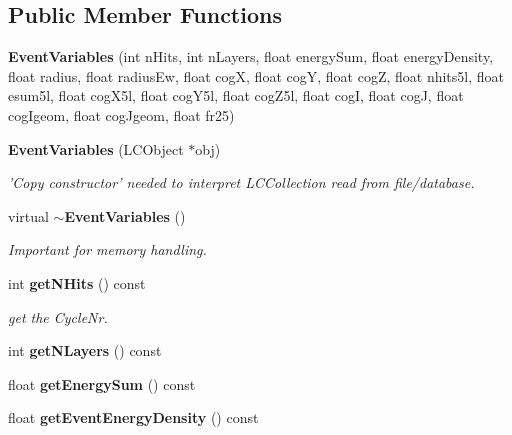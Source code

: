 \subsection*{Public Member Functions}
\begin{DoxyCompactItemize}
\item 
{\bfseries Event\-Variables} (int n\-Hits, int n\-Layers, float energy\-Sum, float energy\-Density, float radius, float radius\-Ew, float cog\-X, float cog\-Y, float cog\-Z, float nhits5l, float esum5l, float cog\-X5l, float cog\-Y5l, float cog\-Z5l, float cog\-I, float cog\-J, float cog\-Igeom, float cog\-Jgeom, float fr25)\label{classCALICE_1_1EventVariables_a65183b6cf71a7d599d7ce195b07ad903}

\item 
{\bf Event\-Variables} (L\-C\-Object $\ast$obj)\label{classCALICE_1_1EventVariables_a97d6ba35bb042c9a6b176421d027737f}

\begin{DoxyCompactList}\small\item\em 'Copy constructor' needed to interpret L\-C\-Collection read from file/database. \end{DoxyCompactList}\item 
virtual {\bf $\sim$\-Event\-Variables} ()\label{classCALICE_1_1EventVariables_a2e106ab35d88b4f406c42217f118f0a0}

\begin{DoxyCompactList}\small\item\em Important for memory handling. \end{DoxyCompactList}\item 
int {\bf get\-N\-Hits} () const \label{classCALICE_1_1EventVariables_add1c66ed54b08a57109260d3881586eb}

\begin{DoxyCompactList}\small\item\em get the Cycle\-Nr. \end{DoxyCompactList}\item 
int {\bfseries get\-N\-Layers} () const \label{classCALICE_1_1EventVariables_ac44e0ec8d550a469994c433c279721ad}

\item 
float {\bfseries get\-Energy\-Sum} () const \label{classCALICE_1_1EventVariables_a2fe40be05a43f725c69dfe1667738bae}

\item 
float {\bfseries get\-Event\-Energy\-Density} () const \label{classCALICE_1_1EventVariables_ad7dde297789849808a1fbefda6316545}


\end{DoxyCompactItemize}
